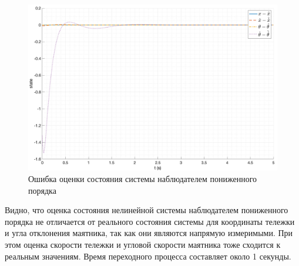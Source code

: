 \begin{figure}[ht!]
    \centering
    \includegraphics[width=\textwidth]{media/plots/reduced_observer/reduced_observer_err_1.png}
    \caption{Ошибка оценки состояния системы наблюдателем пониженного порядка}
    \label{fig:reduced_observer_err_1}
\end{figure}
\FloatBarrier
Видно, что оценка состояния нелинейной системы наблюдателем пониженного порядка 
не отличается от реального состояния системы для координаты тележки и угла отклонения маятника,
так как они являются напрямую измеримыми. При этом оценка скорости тележки и угловой скорости
маятника тоже сходится к реальным значениям. Время переходного процесса составляет около 1 секунды.

